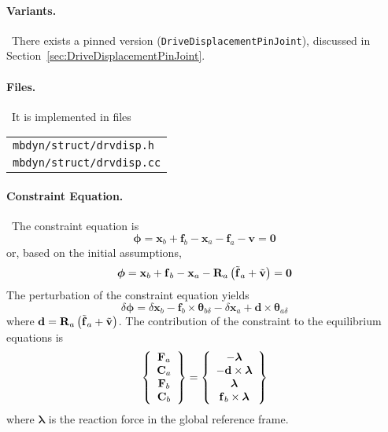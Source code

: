 \documentclass[10pt,dvips,fleqn,subeqn]{report}
\newcommand{\T}[1]{\bm{\mathbf{#1}}}
\begin{document}
\paragraph{Variants.} \
There exists a pinned version (\texttt{DriveDisplacementPinJoint}),
discussed in Section~\ref{sec:DriveDisplacementPinJoint}.

\paragraph{Files.} \
It is implemented in files

\begin{tabular}{l}
\texttt{mbdyn/struct/drvdisp.h} \\
\texttt{mbdyn/struct/drvdisp.cc}
\end{tabular}

\paragraph{Constraint Equation.} \
The constraint equation is
\begin{equation}
	\T{\phi} = \T{x}_b + \T{f}_b - \T{x}_a - \T{f}_a - \T{v} = \T{0}
\end{equation}
or, based on the initial assumptions,
\begin{equation}
	\T{\phi} = \T{x}_b + \T{f}_b - \T{x}_a
		- \T{R}_a\plbr{\tilde{\T{f}}_a + \tilde{\T{v}}} = \T{0}
\end{equation}
The perturbation of the constraint equation yields
\begin{equation}
	\delta\T{\phi} = 
		\delta\T{x}_b
		- \T{f}_b\times\T{\theta}_{b\delta}
		- \delta\T{x}_a
		+ \T{d}\times\T{\theta}_{a\delta}
\end{equation}
where $\T{d}=\T{R}_a\plbr{\tilde{\T{f}}_a + \tilde{\T{v}}}$.
The contribution of the constraint to the equilibrium equations is
\begin{equation}
	\cubr{\cvvect{
		\T{F}_a \\
		\T{C}_a \\
		\T{F}_b \\
		\T{C}_b
	}} = \cubr{\cvvect{
		- \T{\lambda} \\
		- \T{d}\times\T{\lambda} \\
		\T{\lambda} \\
		\T{f}_b\times\T{\lambda}
	}}
\end{equation}
where $\T{\lambda}$ is the reaction force in the global reference frame.
\end{document}
